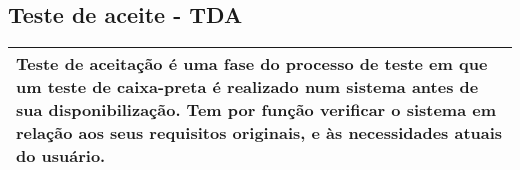 





\subsection{Teste de aceite - TDA}
\label{sec:tda}

\begin{table}[!ht]
\centering
\begin{tabular}{|p{130mm}|}
\hline
Teste de aceitação é uma fase do processo de teste em que um teste de caixa-preta é realizado num sistema antes de sua disponibilização. Tem por função verificar o sistema em relação aos seus requisitos originais, e às necessidades atuais do usuário. \\ 
\hline
\end{tabular}
\end{table}

